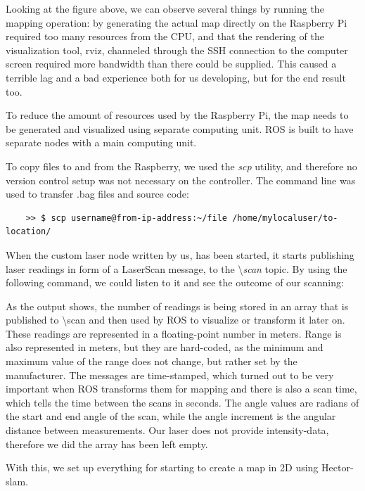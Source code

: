 Looking at the figure above, we can observe several things by running the mapping operation: by generating the actual map directly on the Raspberry Pi required too many resources from the CPU, and that the rendering of the visualization tool, rviz, channeled through the SSH connection to the computer screen required more bandwidth than there could be supplied. This caused a terrible lag and a bad experience both for us developing, but for the end result too.

To reduce the amount of resources used by the Raspberry Pi, the map needs to be generated and visualized using separate computing unit. ROS is built to have separate nodes with a main computing unit.

To copy files to and from the Raspberry, we used the \textit{scp} utility, and therefore no version control setup was not necessary on the controller. The command line was used to transfer .bag files and source code:
\begin{lstlisting}
	>> $ scp username@from-ip-address:~/file /home/mylocaluser/to-location/
\end{lstlisting}

When the custom laser node written by us, has been started, it starts publishing laser readings in form of a LaserScan message, to the \textbackslash\textit{scan} topic. By using the following command, we could listen to it and see the outcome of our scanning:



As the output shows, the number of readings is being stored in an array that is published to \textbackslash scan and then used by ROS to visualize or transform it later on. These readings are represented in a floating-point number in meters. Range is also represented in meters, but they are hard-coded, as the minimum and maximum value of the range does not change, but rather set by the manufacturer. The messages are time-stamped, which turned out to be very important when ROS transforms them for mapping and there is also a scan time, which tells the time between the scans in seconds. The angle values are radians of the start and end angle of the scan, while the angle increment is the angular distance between measurements. Our laser does not provide intensity-data, therefore we did the array has been left empty.

With this, we set up everything for starting to create a map in 2D using Hector-slam.